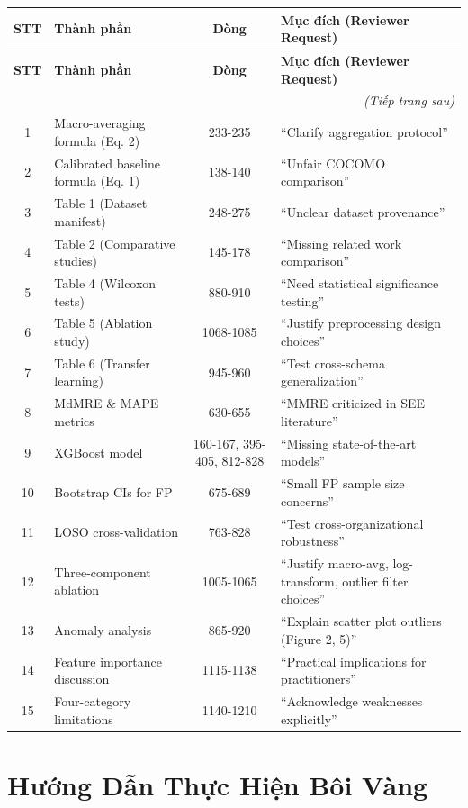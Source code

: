 \documentclass[11pt,a4paper]{article}
\begin{document}
\begin{longtable}{cp{}cp{}}
\toprule
\textbf{STT} & \textbf{Thành phần} & \textbf{Dòng} & \textbf{Mục đích (Reviewer Request)} \\
\midrule
\endfirsthead
\toprule
\textbf{STT} & \textbf{Thành phần} & \textbf{Dòng} & \textbf{Mục đích (Reviewer Request)} \\
\midrule
\endhead
\midrule
\multicolumn{4}{r}{\textit{(Tiếp trang sau)}} \\
\endfoot
\bottomrule
\endlastfoot

1 & Macro-averaging formula (Eq. 2) & 233-235 & ``Clarify aggregation protocol'' \\
2 & Calibrated baseline formula (Eq. 1) & 138-140 & ``Unfair COCOMO comparison'' \\
3 & Table 1 (Dataset manifest) & 248-275 & ``Unclear dataset provenance'' \\
4 & Table 2 (Comparative studies) & 145-178 & ``Missing related work comparison'' \\
5 & Table 4 (Wilcoxon tests) & 880-910 & ``Need statistical significance testing'' \\
6 & Table 5 (Ablation study) & 1068-1085 & ``Justify preprocessing design choices'' \\
7 & Table 6 (Transfer learning) & 945-960 & ``Test cross-schema generalization'' \\
8 & MdMRE \& MAPE metrics & 630-655 & ``MMRE criticized in SEE literature'' \\
9 & XGBoost model & 160-167, 395-405, 812-828 & ``Missing state-of-the-art models'' \\
10 & Bootstrap CIs for FP & 675-689 & ``Small FP sample size concerns'' \\
11 & LOSO cross-validation & 763-828 & ``Test cross-organizational robustness'' \\
12 & Three-component ablation & 1005-1065 & ``Justify macro-avg, log-transform, outlier filter choices'' \\
13 & Anomaly analysis & 865-920 & ``Explain scatter plot outliers (Figure 2, 5)'' \\
14 & Feature importance discussion & 1115-1138 & ``Practical implications for practitioners'' \\
15 & Four-category limitations & 1140-1210 & ``Acknowledge weaknesses explicitly'' \\
\end{longtable}

\section{Hướng Dẫn Thực Hiện Bôi Vàng}
\end{document}
